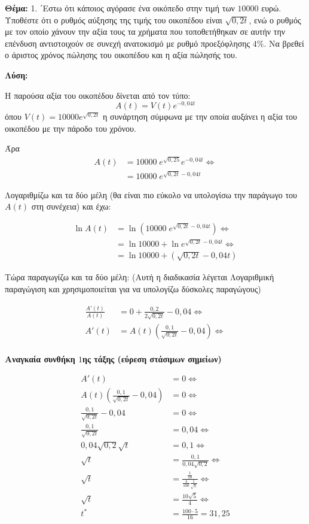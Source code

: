 \documentclass[a4paper,12pt]{article}
\begin{document}
{\bfseries Θέμα:} 1. ΄Εστω ότι κάποιος αγόρασε ένα οικόπεδο στην τιμή των $10000$ ευρώ. Υποθέστε
ότι ο ρυθμός αύξησης της τιμής του οικοπέδου είναι
$\sqrt{0,2t}$, ενώ ο ρυθμός με τον
οποίο χάνουν την αξία τους τα χρήματα που τοποθετήθηκαν σε αυτήν την επένδυση
αντιστοιχούν σε συνεχή ανατοκισμό με ρυθμό προεξόφλησης $4\%$. Να βρεθεί ο άριστος
χρόνος πώλησης του οικοπέδου και η αξία πώλησής του. 

\vspace{\baselineskip}

{\bfseries Λύση:}

Η παρούσα αξία του οικοπέδου δίνεται από τον τύπο:
\[
A(t)=V(t)e^{-0,04t}
\]
όπου $V(t)=10000e^{\sqrt{0,2t}}$ η συνάρτηση σύμφωνα με την οποία αυξάνει η αξία του οικοπέδου με την πάροδο του χρόνου.

Άρα
\begin{align*}
A(t)&=10000\; e^{\sqrt{0,25}}e^{-0,04t} \Leftrightarrow \\
&=10000\; e^{\sqrt{0,2t}-0,04t} 
\end{align*}

Λογαριθμίζω και τα δύο μέλη (θα είναι πιο εύκολο να υπολογίσω την παράγωγο του $A(t)$ στη συνέχεια) και έχω:

\begin{align*}
\ln A(t) &= \ln(10000\; e^{\sqrt{0,2t}-0,04t}) \Leftrightarrow \\
&=\ln 10000 + \ln e^{\sqrt{0,2t}-0,04t} \Leftrightarrow \\
&=\ln 10000 + (\sqrt{0,2t} - 0,04t) 
\end{align*}

Τώρα παραγωγίζω και τα δύο μέλη: (Αυτή η διαδικασία λέγεται Λογαριθμική παραγώγιση και χρησιμοποιείται για να υπολογίζω δύσκολες παραγώγους)

\begin{align*}
\frac{A'(t)}{A(t)} &= 0 + \frac{0,2}{2\sqrt{0,2t}} - 0,04 \Leftrightarrow \\
A'(t) &= A(t) (\frac{0,1}{\sqrt{0,2t}}-0,04) \Leftrightarrow \\
\end{align*}

{\bfseries Αναγκαία συνθήκη $1$ης τάξης (εύρεση στάσιμων σημείων)}

\begin{align*}
A'(t)&=0 \Leftrightarrow \\
A(t) (\frac{0,1}{\sqrt{0,2t}}-0,04) &=0 \Leftrightarrow \\
\frac{0,1}{\sqrt{0,2t}}-0,04 &=0 \Leftrightarrow \\
\frac{0,1}{\sqrt{0,2t}} &= 0,04 \Leftrightarrow \\
0,04\sqrt{0,2}\sqrt{t} &= 0,1 \Leftrightarrow \\
\sqrt{t} &= \frac{0,1}{0,04\sqrt{0,2}} \Leftrightarrow \\
\sqrt{t} &= \frac{\frac{1}{10}}{\frac{4}{100}\frac{1}{\sqrt{5}}} \Leftrightarrow \\ 
\sqrt{t} &= \frac{10\sqrt{5}}{4} \Leftrightarrow \\
t^* &= \frac{100\cdot 5}{16} = 31,25 
\end{align*}
\end{document}
